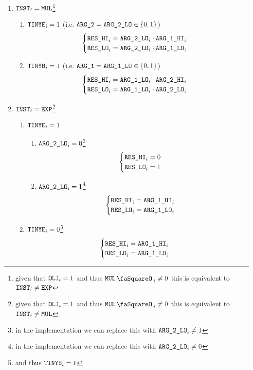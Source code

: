 \begin{enumerate}
	\item \If $\texttt{INST}_{i} = \texttt{MUL}$\footnote{given that $\texttt{OLI}_{i} = 1$ and thus $\mulStamp_{i} \neq 0$ this is equivalent to $\texttt{INST}_{i} \neq \texttt{EXP}$} \Then
	\begin{enumerate}
		\item \If $\texttt{TINYE}_{i} = 1$ (i.e. $\texttt{ARG}\texttt{\_2} = \texttt{ARG}\texttt{\_2}\texttt{\_LO} \in \{ 0, 1 \}$) \Then
		\[
		\begin{cases}
			\texttt{RES}\texttt{\_HI}_{i} = \texttt{ARG}\texttt{\_2}\texttt{\_LO}_{i} \cdot \texttt{ARG}\texttt{\_1}\texttt{\_HI}_{i} \\
			\texttt{RES}\texttt{\_LO}_{i} = \texttt{ARG}\texttt{\_2}\texttt{\_LO}_{i} \cdot \texttt{ARG}\texttt{\_1}\texttt{\_LO}_{i} \\
		\end{cases}
		\]
		\item \If $\texttt{TINYB}_{i} = 1$ (i.e. $\texttt{ARG}\texttt{\_1} = \texttt{ARG}\texttt{\_1}\texttt{\_LO} \in \{ 0, 1 \}$) \Then
		\[
		\begin{cases}
			\texttt{RES}\texttt{\_HI}_{i} = \texttt{ARG}\texttt{\_1}\texttt{\_LO}_{i} \cdot \texttt{ARG}\texttt{\_2}\texttt{\_HI}_{i} \\
			\texttt{RES}\texttt{\_LO}_{i} = \texttt{ARG}\texttt{\_1}\texttt{\_LO}_{i} \cdot \texttt{ARG}\texttt{\_2}\texttt{\_LO}_{i} \\
		\end{cases}
		\]
	\end{enumerate}
	\item \If $\texttt{INST}_{i} = \texttt{EXP}$\footnote{given that $\texttt{OLI}_{i} = 1$ and thus $\mulStamp_{i} \neq 0$ this is equivalent to $\texttt{INST}_{i} \neq \texttt{MUL}$} \Then
	\begin{enumerate}
		\item \If $\texttt{TINYE}_{i} = 1$ \Then
		\begin{enumerate}
			\item \If $\texttt{ARG}\texttt{\_2}\texttt{\_LO}_{i} = 0$\footnote{in the implementation we can replace this with \If $\texttt{ARG}\texttt{\_2}\texttt{\_LO}_{i} \neq 1$} \Then 
			\[
			\begin{cases}
				\texttt{RES}\texttt{\_HI}_{i} = 0 \\
				\texttt{RES}\texttt{\_LO}_{i} = 1 \\
			\end{cases}
			\]
			\item \If $\texttt{ARG}\texttt{\_2}\texttt{\_LO}_{i} = 1$\footnote{in the implementation we can replace this with \If $\texttt{ARG}\texttt{\_2}\texttt{\_LO}_{i} \neq 0$} \Then 
			\[
			\begin{cases}
				\texttt{RES}\texttt{\_HI}_{i} = \texttt{ARG}\texttt{\_1}\texttt{\_HI}_{i} \\
				\texttt{RES}\texttt{\_LO}_{i} = \texttt{ARG}\texttt{\_1}\texttt{\_LO}_{i} \\
			\end{cases}
			\]
		\end{enumerate}
		\item \If $\texttt{TINYE}_{i} = 0$\footnote{and thus $\texttt{TINYB}_{i} = 1$} \Then
		\[
		\begin{cases}
			\texttt{RES}\texttt{\_HI}_{i} = \texttt{ARG}\texttt{\_1}\texttt{\_HI}_{i} \\
			\texttt{RES}\texttt{\_LO}_{i} = \texttt{ARG}\texttt{\_1}\texttt{\_LO}_{i} \\
		\end{cases}
		\]
	\end{enumerate}
\end{enumerate}
